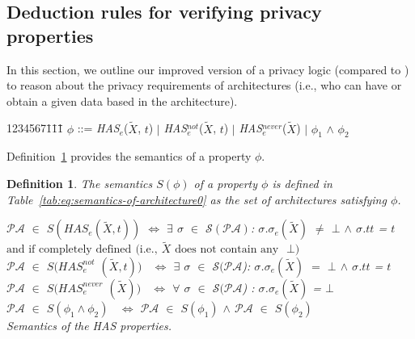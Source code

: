 \documentclass[a4paper]{article}
\newtheorem{ttd}{Definition}
\begin{document}
\subsection{Deduction rules for verifying privacy properties}
\label{sec:plogic0}

In this section, we outline our improved version of a privacy logic (compared to \cite{TaAntignac14}) to reason about the privacy requirements of architectures (i.e., who can have or obtain a given data based in the architecture).  

\begin{tabbing}    
    1234567\=1\=1\=1\= \kill
    \> $\phi$ ::=  \textit{HAS}$_e$($\tilde{X}$, $t$) $|$ \textit{HAS}$^{\textit{not}}_e$($\tilde{X}$, $t$) $|$ \textit{HAS}$^{\textit{never}}_e$($\tilde{X}$) $|$ $\phi_1$ $\wedge$ $\phi_2$\\ 
\end{tabbing}

\noindent Definition~\ref{ttd:logsem} provides the semantics of a property $\phi$.

\begin{ttd}
\label{ttd:logsem}  
The semantics $S(\phi)$ of a property $\phi$ is defined in Table~\ref{tab:eq:semantics-of-architecture0} as the set of architectures satisfying $\phi$.

\begin{table}[htb!]
$\mathcal{P}\mathcal{A}$ $\in$ $S(\textit{HAS}_e\left(\tilde{X}, t \right))$ $\Leftrightarrow$  $\exists$ $\sigma$ $\in$ $\mathcal{S}(\mathcal{P}\mathcal{A})$: $\sigma$.$\sigma_e$$(\tilde{X})$ $\neq$ $\bot$ $\wedge$ $\sigma$.$tt$ = $t$ $\text{and if completely defined}$ $\text{(i.e.,}$ $\tilde{X}$ $\text{does not contain any }$ $\bot$$\text{)}$\\

$\mathcal{P}\mathcal{A}$ $\in$ $S(\textit{HAS}_e^\textit{not}$ $\left(\tilde{X}, t\right))$ \, $\Leftrightarrow$ $\exists$ $\sigma$ $\in$ $\mathcal{S}(\mathcal{P}\mathcal{A}$): $\sigma$.$\sigma_e$$(\tilde{X})$ $=$ $\bot$ $\wedge$ $\sigma$.$tt$ = $t$\\

$\mathcal{P}\mathcal{A}$ $\in$ $S(\textit{HAS}_e^\textit{never}$ $\left( \tilde{X} \right))$ \, $\Leftrightarrow$  $\forall$ $\sigma$ $\in$ $\mathcal{S}(\mathcal{P}\mathcal{A}$) : $\sigma$.$\sigma_e(\tilde{X})$ = $\bot$\\

$\mathcal{P}\mathcal{A}$ $\in$ $S(\phi_1 \wedge \phi_2)$ \,  $\Leftrightarrow$  $\mathcal{P}\mathcal{A}$ $\in$ $S(\phi_1)$ $\wedge$ $\mathcal{P}\mathcal{A}$ $\in$ $S(\phi_2)$\\
\caption{Semantics of the HAS properties.}
\label{tab:eq:semantics-of-architecture0}
\end{table}
\end{ttd}
\end{document}

